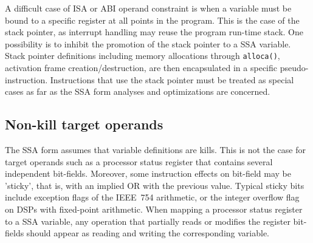 A difficult case of ISA or ABI operand constraint is when a variable must be
bound to a specific register at all points in the program. This is the case of
the stack pointer, as interrupt handling may reuse the program run-time stack.
One possibility is to inhibit the promotion of the stack pointer to a SSA
variable. Stack pointer definitions including memory allocations through
\verb|alloca()|, activation frame creation/destruction, are then encapsulated in
a specific pseudo-instruction. Instructions that use the stack pointer must be
treated as special cases as far as the SSA form analyses and optimizations are
concerned.

\subsection{Non-kill target operands} \label{sec:non-kill-target}

The SSA form assumes that variable definitions are kills. This is not the case
for target operands such as a processor status register that contains several
independent bit-fields. Moreover, some instruction effects on bit-field may be
'sticky', that is, with an implied OR with the previous value. Typical sticky
bits include exception flags of the IEEE~754 arithmetic, or the integer overflow
flag on DSPs with fixed-point arithmetic. When mapping a processor status
register to a SSA variable, any operation that partially reads or modifies the
register bit-fields should appear as reading and writing the corresponding
variable.

